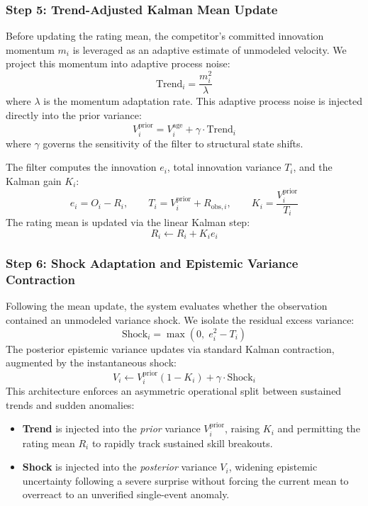 \documentclass[12pt]{article}
\newcommand{\gammad}{\gamma}    %
\newcommand{\lambdad}{\lambda}  %
\begin{document}
	\subsubsection*{Step 5: Trend-Adjusted Kalman Mean Update}
	Before updating the rating mean, the competitor's committed innovation momentum $m_i$ is leveraged as an adaptive estimate of unmodeled velocity. We project this momentum into adaptive process noise:
	\begin{equation}
		\text{Trend}_i = \frac{m_i^2}{\lambdad}
	\end{equation}
	where $\lambdad$ is the momentum adaptation rate. This adaptive process noise is injected directly into the prior variance:
	\begin{equation}
		V_i^{\mathrm{prior}} = V_i^{\mathrm{age}} + \gammad \cdot \text{Trend}_i
	\end{equation}
	where $\gammad$ governs the sensitivity of the filter to structural state shifts. 
	
	The filter computes the innovation $e_i$, total innovation variance $T_i$, and the Kalman gain $K_i$:
	\begin{equation}
		e_i = O_i - R_i, \qquad T_i = V_i^{\mathrm{prior}} + R_{\mathrm{obs},i}, \qquad K_i = \frac{V_i^{\mathrm{prior}}}{T_i}
	\end{equation}
	The rating mean is updated via the linear Kalman step:
	\begin{equation}
		R_i \leftarrow R_i + K_i e_i
	\end{equation}
	
	\subsubsection*{Step 6: Shock Adaptation and Epistemic Variance Contraction}
	Following the mean update, the system evaluates whether the observation contained an unmodeled variance shock. We isolate the residual excess variance:
	\begin{equation}
		\text{Shock}_i = \max\!\left(0,\; e_i^2 - T_i\right)
	\end{equation}
	The posterior epistemic variance updates via standard Kalman contraction, augmented by the instantaneous shock:
	\begin{equation}
		V_i \leftarrow V_i^{\mathrm{prior}}(1 - K_i) + \gammad \cdot \text{Shock}_i
	\end{equation}
	This architecture enforces an asymmetric operational split between sustained trends and sudden anomalies:
	\begin{itemize}
		\item \textbf{Trend} is injected into the \textit{prior} variance $V_i^{\mathrm{prior}}$, raising $K_i$ and permitting the rating mean $R_i$ to rapidly track sustained skill breakouts.
		\item \textbf{Shock} is injected into the \textit{posterior} variance $V_i$, widening epistemic uncertainty following a severe surprise without forcing the current mean to overreact to an unverified single-event anomaly.
	\end{itemize}
	
\end{document}
